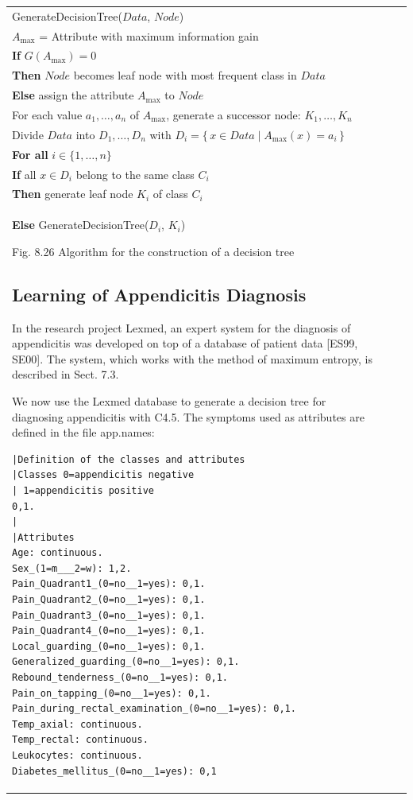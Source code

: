 \documentclass[10pt]{book}
\begin{document}
\begin{center}
\begin{tabular}{|l|l|l|}
\noindent
GenerateDecisionTree($\mathit{Data}$, $\mathit{Node}$)\\
$A_{\max}$ = Attribute with maximum information gain\\
\textbf{If} $G(A_{\max}) = 0$\\
\phantom{xx}\textbf{Then} $\mathit{Node}$ becomes leaf node with most frequent class in $\mathit{Data}$\\
\phantom{xx}\textbf{Else} assign the attribute $A_{\max}$ to $\mathit{Node}$\\
\phantom{xx}\hspace{1em}For each value $a_{1}, \ldots, a_{n}$ of $A_{\max}$, generate a successor node: $K_{1}, \ldots, K_{n}$\\
\phantom{xx}\hspace{1em}Divide $\mathit{Data}$ into $D_{1}, \ldots, D_{n}$ with $D_{i} = \{\, x \in \mathit{Data} \mid A_{\max}(x) = a_{i} \,\}$\\
\phantom{xx}\hspace{1em}\textbf{For all} $i \in \{1, \ldots, n\}$\\
\phantom{xx}\hspace{2em}\textbf{If} all $x \in D_{i}$ belong to the same class $C_{i}$\\
\phantom{xx}\hspace{3em}\textbf{Then} generate leaf node $K_{i}$ of class $C_{i}$\\
\phantom{xx}\hspace{3em}\textbf{Else} GenerateDecisionTree($D_{i}$, $K_{i}$)

\noindent
Fig. 8.26 Algorithm for the construction of a decision tree

\subsection{Learning of Appendicitis Diagnosis}
In the research project Lexmed, an expert system for the diagnosis of appendicitis was developed on top of a database of patient data [ES99, SE00]. The system, which works with the method of maximum entropy, is described in Sect. 7.3.

We now use the Lexmed database to generate a decision tree for diagnosing appendicitis with C4.5. The symptoms used as attributes are defined in the file app.names:
\begin{verbatim}
|Definition of the classes and attributes
|Classes 0=appendicitis negative
| 1=appendicitis positive
0,1.
|
|Attributes
Age: continuous.
Sex_(1=m___2=w): 1,2.
Pain_Quadrant1_(0=no__1=yes): 0,1.
Pain_Quadrant2_(0=no__1=yes): 0,1.
Pain_Quadrant3_(0=no__1=yes): 0,1.
Pain_Quadrant4_(0=no__1=yes): 0,1.
Local_guarding_(0=no__1=yes): 0,1.
Generalized_guarding_(0=no__1=yes): 0,1.
Rebound_tenderness_(0=no__1=yes): 0,1.
Pain_on_tapping_(0=no__1=yes): 0,1.
Pain_during_rectal_examination_(0=no__1=yes): 0,1.
Temp_axial: continuous.
Temp_rectal: continuous.
Leukocytes: continuous.
Diabetes_mellitus_(0=no__1=yes): 0,1
\end{verbatim}


\end{tabular}
\end{center}
\end{document}
